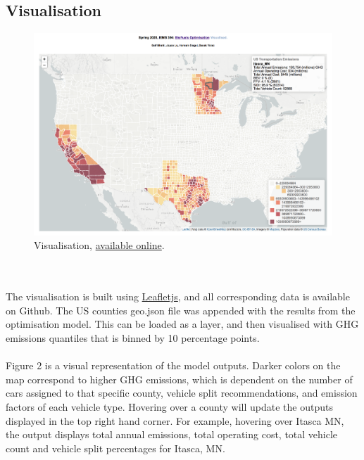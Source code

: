 \documentclass[answers]{exam}
\begin{document}
\subsection{Visualisation}
\begin{figure}[h]
    \centering
    \includegraphics[scale=0.4]{new_visual.png}
    \caption{Visualisation, \href{http://www.saifbhatti.com/iems394}{available online}.}
    \label{fig:my_label}
\end{figure}
\\~\\
The visualisation is built using \href{https://leafletjs.com}{Leafletjs}, and all corresponding data is available on Github. The US counties geo.json file was appended with the results from the optimisation model. This can be loaded as a layer, and then visualised with GHG emissions quantiles that is binned by 10 percentage points.
\\ ~\\
Figure 2 is a visual representation of the model outputs. Darker colors on the map correspond to higher GHG emissions, which is dependent on the number of cars assigned to that specific county, vehicle split recommendations, and emission factors of each vehicle type. Hovering over a county will update the outputs displayed in the top right hand corner. For example, hovering over Itasca MN, the output displays total annual emissions, total operating cost, total vehicle count and vehicle split percentages for Itasca, MN. 
\end{document}

